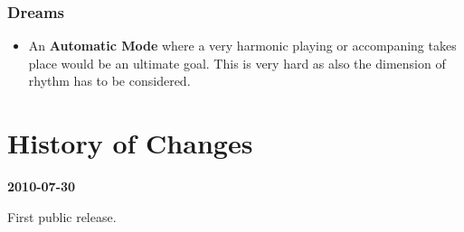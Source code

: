 \documentclass[12pt,a4paper,titlepage,oneside]{report}
\begin{document}
\subsection{Dreams}

\begin{itemize}

	\item An \textbf{Automatic Mode} where a very harmonic playing or accompaning takes place would be an ultimate goal. This is very hard as also the dimension of rhythm has to be considered.

\end{itemize}


\appendix
%

\chapter{History of Changes}
\label{chap:history}

\textbf{2010-07-30}

First public release.


\clearpage
{}

%
%
\end{document}
